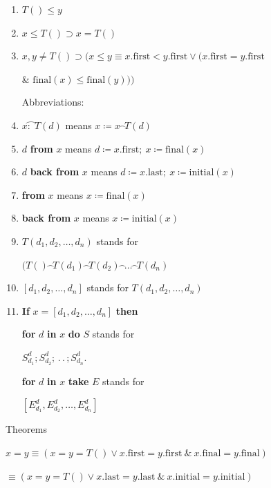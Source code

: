 \documentclass[twoside,11pt]{book}
\let\wideparen\overparen
\begin{document}
\begin{enumerate}[wide, nosep, label=(\arabic*)]
	\noindent
	For an ordered sequence type we have:

	\item $T() \leqslant y$
	\item $x \leqslant T() \supset x = T()$
	\item $x, y \neq T() \supset (x \leqslant y \equiv x.\text{first} < y.\text{first} \lor (x.\text{first} = y.\text{first}$
	
	\tabto*{12.6em}\& $\text{final}(x) \leqslant \text{final}(y)))$

	\noindent	
	Abbreviations:

	\item  $x\wideparen{\text{:} \ \ }T(d)$ \tabto*{11em} means $x \coloneq x\wideparen{\ \ }T(d)$
	\item $d$ \textbf{from} $x$\tabto*{11em} means $d\coloneq x.\text{first};\ x\coloneq \text{final}(x)$
	\item $d$ \textbf{back from} $x$\tabto*{11em} means $d\coloneq x.\text{last};\ x\coloneq \text{initial}(x)$
	\item \textbf{from} $x$\tabto*{11em} means $x\coloneq \text{final}(x)$
	\item \textbf{back from} $x$\tabto*{11em} means $x\coloneq \text{initial}(x)$
	\item $T(d_1, d_2, \dots, d_n)$ stands for
	
	\qquad\quad $(T()\wideparen{\ \ }T(d_1)\wideparen{\ \ }T(d_2)\wideparen{\ \ }\dots\wideparen{\ \ }T(d_n)$
	
	\item $[d_1, d_2, \dots, d_n]$ stands for $T(d_1, d_2, \dots, d_n)$
	\item \textbf{If} $x = [d_1, d_2, \dots, d_n]$ \textbf{then}
	
	\qquad \quad \textbf{for} $d$ \textbf{in} $x$ \textbf{do} $S$ stands for

	\qquad \qquad \qquad $S_{d_1}^d; S_{d_2}^d; \,.\,.\,; S_{d_n}^d$.


	\qquad \quad \textbf{for} $d$ \textbf{in} $x$ \textbf{take} $E$ stands for
	
	\qquad \qquad \qquad $[E_{d_1}^d, E_{d_2}^d, \dots, E_{d_n}^d]$

\end{enumerate}

\noindent
Theorems

	\quad $x = y \equiv (x = y = T() \lor x.\text{first} = y.\text{first}\ \&\ x.\text{final} = y.\text{final})$

	\tabto*{4.9em} $\equiv (x = y = T() \lor x.\text{last} = y.\text{last}\ \&\ x.\text{initial} = y.\text{initial})$
	\bigskip
\end{document}
